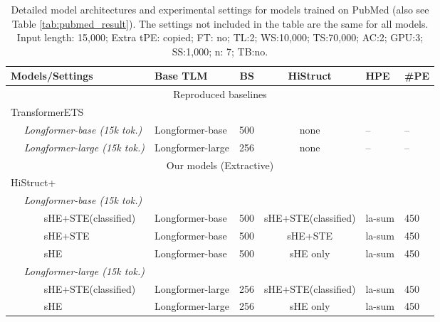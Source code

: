 \documentclass[11pt]{article}
\begin{document}
\begin{table*}
\fontsize{9}{9}
\selectfont
\centering
\begin{tabular}{@{}llrcll@{}}
\toprule
Models/Settings &
  Base TLM &
  BS &
  HiStruct &
  HPE &
  \#PE 
  \\ 
  \midrule
  
\multicolumn{6}{c}{Reproduced baselines} \\ \midrule
TransformerETS &&&&& \\
~~ \textit{Longformer-base (15k tok.)} &
  Longformer-base &
  500 &
  none &
  -- &
  -- \\
~~ \textit{Longformer-large (15k tok.)} &
  Longformer-large &
  256 &
  none &
  -- &
  -- \\ \midrule
\multicolumn{6}{c}{Our models (Extractive)} \\ \midrule
HiStruct+ &&&&& \\
~~ \textit{Longformer-base (15k tok.)} \\ 
~~~~~~ sHE+STE(classified) &
  Longformer-base &
  500 &
  sHE+STE(classified) &
  la-sum &
  450 \\
~~~~~~ sHE+STE &
  Longformer-base &
  500 &
  sHE+STE &
  la-sum &
  450\\
~~~~~~ sHE &
  Longformer-base &
  500 &
  sHE only &
  la-sum &
  450 \\ 
~~ \textit{Longformer-large (15k tok.)}\\ 
~~~~~~ sHE+STE(classified)&
  Longformer-large &
  256 &
  sHE+STE(classified) &
  la-sum &
  450 \\
~~~~~~ sHE &
  Longformer-large &
  256 &
  sHE only &
  la-sum &
  450 \\
 \bottomrule
\end{tabular}
\caption[Experimental settings on PubMed]{Detailed model architectures and experimental settings for models trained on PubMed (also see Table \ref{tab:pubmed_result}). The settings not included in the table are the same for all models. Input length: 15,000; Extra tPE: copied; FT: no; TL:2; WS:10,000; TS:70,000; AC:2; GPU:3; SS:1,000; n: 7; TB:no.}
  \label{tab:detailed_experimental_settings_on_pubmed_overview}
\end{table*}
\end{document}

